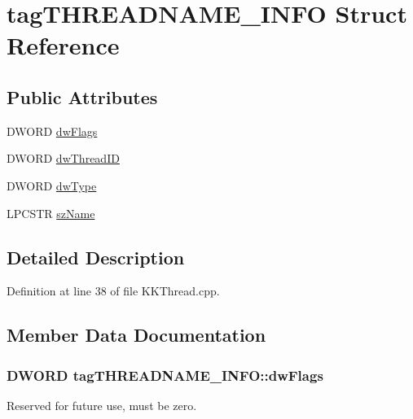 \hypertarget{structtag_t_h_r_e_a_d_n_a_m_e___i_n_f_o}{}\section{tag\+T\+H\+R\+E\+A\+D\+N\+A\+M\+E\+\_\+\+I\+N\+FO Struct Reference}
\label{structtag_t_h_r_e_a_d_n_a_m_e___i_n_f_o}
\subsection*{Public Attributes}
\begin{DoxyCompactItemize}
\item 
D\+W\+O\+RD \hyperlink{structtag_t_h_r_e_a_d_n_a_m_e___i_n_f_o_a9dd3944220c9717fa6a9809a8cab13ad}{dw\+Flags}
\item 
D\+W\+O\+RD \hyperlink{structtag_t_h_r_e_a_d_n_a_m_e___i_n_f_o_a24718e7417e1e20715b29d4f1a0be68f}{dw\+Thread\+ID}
\item 
D\+W\+O\+RD \hyperlink{structtag_t_h_r_e_a_d_n_a_m_e___i_n_f_o_ae02b6e443275505c76334349917ac19a}{dw\+Type}
\item 
L\+P\+C\+S\+TR \hyperlink{structtag_t_h_r_e_a_d_n_a_m_e___i_n_f_o_ad053e3f32a5793f307875286fd9e7afc}{sz\+Name}
\end{DoxyCompactItemize}


\subsection{Detailed Description}


Definition at line 38 of file K\+K\+Thread.\+cpp.



\subsection{Member Data Documentation}
\subsubsection[{\texorpdfstring{dw\+Flags}{dwFlags}}]{\setlength{\rightskip}{0pt plus 5cm}D\+W\+O\+RD tag\+T\+H\+R\+E\+A\+D\+N\+A\+M\+E\+\_\+\+I\+N\+F\+O\+::dw\+Flags}\hypertarget{structtag_t_h_r_e_a_d_n_a_m_e___i_n_f_o_a9dd3944220c9717fa6a9809a8cab13ad}{}\label{structtag_t_h_r_e_a_d_n_a_m_e___i_n_f_o_a9dd3944220c9717fa6a9809a8cab13ad}
Reserved for future use, must be zero. 

